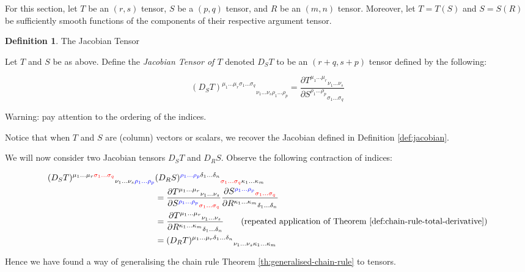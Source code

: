 \documentclass[a4paper]{article}
\theoremstyle{plain} %
\theoremstyle{definition} %
\newtheorem{definition}[theorem]{Definition}
\numberwithin{equation}{subsection}
\newcommand{\del}[2]{\frac{\partial #1}{\partial #2}}
\begin{document}
For this section, let $T$ be an $(r,s)$ tensor, $S$ be a $(p,q)$ tensor, and $R$ be an $(m,n)$ tensor. Moreover, let 
$T = T(S)$ and $S = S(R)$ be sufficiently smooth functions of the components of their respective argument tensor.

\begin{definition} \label{def:tensor-jacobian}
  The Jacobian Tensor

  Let $T$ and $S$ be as above. Define the \emph{Jacobian Tensor of $T$} denoted $D_S T$ to be an $(r+q,s+p)$ tensor defined by the following:

  \[ {(D_S T)^{\mu_1 \dots \mu_r \sigma_1 \dots \sigma_q }}_{\nu_1 \dots \nu_s \rho_1 \dots \rho_p} = 
  \del{{T^{\mu_1 \dots \mu_r  }}_{\nu_1 \dots \nu_s}}
  {{S^{\rho_1 \dots \rho_p}}_{\sigma_1 \dots \sigma_q }}\]

  Warning: pay attention to the ordering of the indices.
\end{definition}

Notice that when $T$ and $S$ are (column) vectors or scalars, we recover the Jacobian defined in Definition \ref{def:jacobian}.

We will now consider two Jacobian tensors $D_S T$ and $D_R S$. Observe the following contraction of indices:

\begin{align*}
  {(D_S T)^{\mu_1 \dots \mu_r \textcolor{red}{\sigma_1 \dots \sigma_q }}}_{\nu_1 \dots \nu_s \textcolor{blue}{\rho_1 \dots \rho_p}} 
  &{(D_R S)^{\textcolor{blue}{\rho_1 \dots \rho_p} \delta_1 \dots \delta_n }}_{ \textcolor{red}{\sigma_1 \dots \sigma_q } \kappa_1 \dots \kappa_m} \\
  &=   \del{{T^{\mu_1 \dots \mu_r  }}_{\nu_1 \dots \nu_s}}
  {{S^{\textcolor{blue}{\rho_1 \dots \rho_p}}}_{\textcolor{red}{\sigma_1 \dots \sigma_q }  }}   \del{{S^{\textcolor{blue}{\rho_1 \dots \rho_p}}}_{\textcolor{red}{\sigma_1 \dots \sigma_q }  }}
  {{R^{\kappa_1 \dots \kappa_m}}_{\delta_1 \dots \delta_n  }} \\
  &=  \del{{T^{\mu_1 \dots \mu_r  }}_{\nu_1 \dots \nu_s}}
  {{R^{\kappa_1 \dots \kappa_m}}_{\delta_1 \dots \delta_n  }} \tag{repeated application of Theorem \ref{def:chain-rule-total-derivative}} \\
  &= {(D_R T)^{\mu_1 \dots \mu_r  \delta_1 \dots \delta_n }}_{\nu_1 \dots \nu_s \kappa_1 \dots \kappa_m}
\end{align*}

Hence we have found a way of generalising the chain rule Theorem \ref{th:generalised-chain-rule} to tensors.
\end{document}
